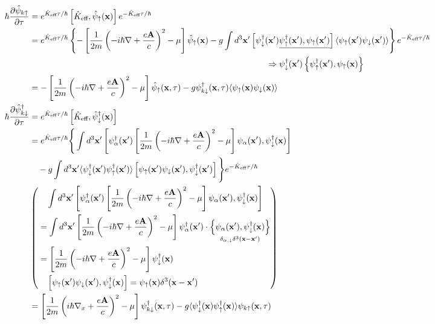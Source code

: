 \[\begin{split}
\hbar\frac{\partial\hat{\psi}_{k\uparrow}}{\partial \tau} &= e^{\hat{K}_{\text{eff}}\tau/\hbar}\left[\hat{K}_{\text{eff}},\hat{\psi}_{\uparrow}({\bf x})\right]e^{-\hat{K}_{\text{eff}}\tau/\hbar}\\
&=e^{\hat{K}_{\text{eff}}\tau/\hbar}\left\{-\left[\frac{1}{2m}\left(-i\hbar\nabla+\frac{e{\bf A}}{c}\right)^2-\mu\right]\hat{\psi}_\uparrow({\bf x}) - g\int d^3{\bf x}' \left[\psi_\downarrow^\dagger({\bf x}')\underline{\psi_\uparrow^\dagger({\bf x}'),\psi_\uparrow({\bf x}')}\right]\langle\psi_\uparrow({\bf x}')\psi_\downarrow({\bf x}')\rangle\right\}e^{-\hat{K}_{\text{eff}}\tau/\hbar}\\
&\quad\quad\quad\quad\quad\quad\quad\quad\quad\quad\quad\quad\quad\quad\quad\quad\quad\quad\quad\quad\quad\quad\quad\quad\quad\quad\quad\quad\Rightarrow\psi_\downarrow^\dagger({\bf x}')\left\{\psi_\uparrow^\dagger({\bf x'}),\psi_\uparrow({\bf x})\right\}\\
&=-\left[\frac{1}{2m}\left(-i\hbar\nabla+\frac{e{\bf A}}{c}\right)^2-\mu\right]\hat{\psi}_\uparrow({\bf x},\tau) - g\psi_{k\downarrow}^\dagger({\bf x},\tau)\langle\psi_\uparrow({\bf x})\psi_\downarrow({\bf x})\rangle\\
\hbar\frac{\partial\hat\psi_{k\downarrow}^\dagger}{\partial \tau}&=e^{\hat{K}_{\text{eff}}\tau/\hbar}\left[\hat{K}_{\text{eff}},\hat{\psi}_\downarrow^\dagger({\bf x})\right]\\
&=e^{\hat{K}_{\text{eff}}\tau/\hbar}\Bigg\{\int d^3{\bf x'}\left[\psi^\dagger_\alpha({\bf x'})\left[\frac{1}{2m}\left(-i\hbar\nabla+\frac{e{\bf A}}{c}\right)^2-\mu\right]\psi_\alpha({\bf x'}),\psi_\downarrow^\dagger({\bf x})\right]\\
&\quad - g\int d^3{\bf x}' \langle\psi^\dagger_\downarrow({\bf x}')\psi^\dagger_\uparrow({\bf x}')\rangle\left[\psi_\uparrow({\bf x}'){\psi_\downarrow({\bf x}'),\psi^\dagger_\downarrow({\bf x}')}\right]\Bigg\}e^{-\hat{K}_{\text{eff}}\tau/\hbar}\\
&\left(
\begin{split}
&\ \ \ \int d^3{\bf x'}\left[\psi^\dagger_\alpha({\bf x'})\left[\frac{1}{2m}\left(-i\hbar\nabla+\frac{e{\bf A}}{c}\right)^2-\mu\right]\psi_\alpha({\bf x'}),\psi_\downarrow^\dagger({\bf x})\right]\\
&=\int d^3{\bf x'}\left[\frac{1}{2m}\left(-i\hbar\nabla+\frac{e{\bf A}}{c}\right)^2-\mu\right]\psi^\dagger_\alpha({\bf x'})\cdot\underset{\delta_{\alpha,\downarrow}\delta^3({\bf x-x'})}{\left\{\psi_\alpha({\bf x'}),\psi_\downarrow^\dagger({\bf x})\right\}}\\
&=\left[\frac{1}{2m}\left(-i\hbar\nabla+\frac{e{\bf A}}{c}\right)^2-\mu\right]\psi_\downarrow^\dagger({\bf x})\\
&\ \ \ \left[\psi_\uparrow({\bf x'})\psi_{\downarrow}({\bf x'}),\psi_\downarrow^\dagger({\bf x})\right] = \psi_\uparrow({\bf x})\delta^3({\bf x-x'})
\end{split}
\right)\\
&=\left[\frac{1}{2m}\left(i\hbar\nabla_x+\frac{e\bf A}{c}\right)^2-\mu\right]\psi^\dagger_{k\downarrow}({\bf x},\tau) - g\langle\psi^\dagger_{\downarrow}({\bf x})\psi^\dagger_{\uparrow}({\bf x})\rangle\psi_{k\uparrow}({\bf x},\tau)
\end{split} \]

